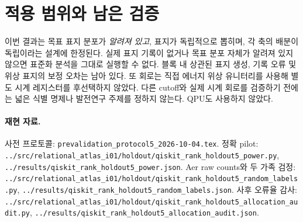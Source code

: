 \documentclass[11pt,a4paper]{article}
\begin{document}
\section{적용 범위와 남은 검증}
이번 결과는 목표 표지 분포가 \emph{알려져 있고}, 표지가
독립적으로 뽑히며, 각 축의 배분이 독립이라는 설계에 한정된다.
실제 표지 기록이 없거나 목표 분포 자체가 알려져 있지 않으면
표준화 분석을 그대로 실행할 수 없다. 블록 내 상관된 표지
생성, 기록 오류 및 위상 표지의 보정 오차는 남아 있다.
또 회로는 직접 에너지 위상 유니터리를 사용해 별도 시계
레지스터를 후선택하지 않았다. 다른 cutoff와 실제 시계 회로를
검증하기 전에는 넓은 식별 명제나 발전연구 주제를 정하지 않는다.
QPU도 사용하지 않았다.

\paragraph{재현 자료.}
사전 프로토콜: \texttt{prevalidation\_protocol5\_2026-10-04.tex}.
정확 pilot: \texttt{../src/relational\_atlas\_i01/holdout/qiskit\_rank\_holdout5\_power.py},
\texttt{../results/qiskit\_rank\_holdout5\_power.json}.
Aer raw counts와 두 가족 검정:
\texttt{../src/relational\_atlas\_i01/holdout/qiskit\_rank\_holdout5\_random\_labels.py},
\texttt{../results/qiskit\_rank\_holdout5\_random\_labels.json}.
사후 오류율 감사:
\texttt{../src/relational\_atlas\_i01/holdout/qiskit\_rank\_holdout5\_allocation\_audit.py},
\texttt{../results/qiskit\_rank\_holdout5\_allocation\_audit.json}.
\end{document}
